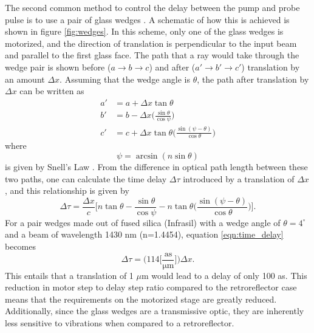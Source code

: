 The second common method to control the delay between the pump and probe pulse is to use a pair of glass wedges \cite{chirlaAttosecondPulseGeneration2011, gormanAttosecondProbingElectron2018, kiesewetterDynamicsNearThresholdAttosecond2019}. A schematic of how this is achieved is shown in figure \ref{fig:wedges}.  In this scheme, only one of the glass wedges is motorized, and the direction of translation is perpendicular to the input beam and parallel to the first glass face.  The path that a ray would take through the wedge pair is shown before ($a\rightarrow b\rightarrow c$) and after ($a' \rightarrow b'\rightarrow c'$) translation by an amount $\Delta x$.  Assuming that the wedge angle is $\theta$, the path after translation by $\Delta x$ can be written as
\begin{align}
\label{eqn:path_lengths}
	a'&=a+\Delta x \tan\theta\\
	b'&=b-\Delta x \bigg(\frac{\sin\theta}{\cos\psi}\bigg)\\
	c'&=c+\Delta x \tan\theta\bigg(\frac{\sin(\psi-\theta)}{\cos\theta}\bigg)
\end{align}
where
\begin{equation}
	\psi = \arcsin(n\sin\theta)
\end{equation}
is given by Snell's Law \cite{pedrottiIntroductionOptics2007}. From the difference in optical path length between these two paths, one can calculate the time delay $\Delta\tau$ introduced by a translation of $\Delta x$, and this relationship is given by
\begin{equation}
\label{eqn:time_delay}
	\Delta\tau = \frac{\Delta x}{c}\Bigg[n\tan\theta - \frac{\sin\theta}{\cos\psi}-n\tan\theta\bigg(\frac{\sin(\psi-\theta)}{\cos\theta}\bigg)\Bigg].
\end{equation}
For a pair wedges made out of fused silica (Infrasil) with a wedge angle of $\theta=4^\circ$ and a beam of wavelength 1430 nm (n=1.4454), equation \ref{eqn:time_delay} becomes
\begin{equation}
\label{eqn:numerical_relationship_wedges}
	\Delta\tau = \Bigg(114 \bigg[\frac{\mathrm{as}}{\mathrm{\mu m}}\bigg]\Bigg)\Delta x.
\end{equation}
This entails that a translation of 1 $\mu$m would lead to a delay of only 100 as.  This reduction in motor step to delay step ratio compared to the retroreflector case means that the requirements on the motorized stage are greatly reduced.  Additionally, since the glass wedges are a transmissive optic, they are inherently less sensitive to vibrations when compared to a retroreflector.

